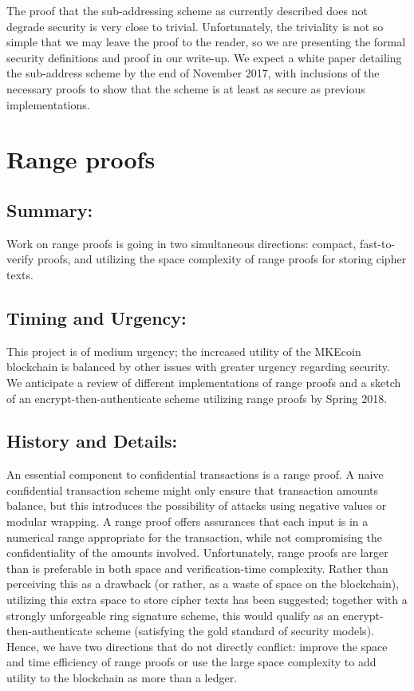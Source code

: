 \documentclass[12pt,english]{mrl}
\theoremstyle{definition}
\numberwithin{equation}{section}
\numberwithin{figure}{section}
\numberwithin{equation}{section}
\numberwithin{equation}{section}
\numberwithin{figure}{section}
\begin{document}
The proof that the sub-addressing scheme as currently described does not degrade security is very close to trivial. Unfortunately, the triviality is not so simple that we may leave the proof to the reader, so we are presenting the formal security definitions and proof in our write-up. We expect a white paper detailing the sub-address scheme by the end of November 2017, with inclusions of the necessary proofs to show that the scheme is at least as secure as previous implementations.





\section{Range proofs} 

\subsection{Summary:} 

Work on range proofs is going in two simultaneous directions: compact, fast-to-verify proofs, and utilizing the space complexity of range proofs for storing cipher texts.

\subsection{Timing and Urgency:} 

This project is of medium urgency; the increased utility of the MKEcoin blockchain is balanced by other issues with greater urgency regarding security. We anticipate a review of different implementations of range proofs and a sketch of an encrypt-then-authenticate scheme utilizing range proofs by Spring 2018.

\subsection{History and Details:} 

An essential component to confidential transactions is a range proof. A naive confidential transaction scheme might only ensure that transaction amounts balance, but this introduces the possibility of attacks using negative values or modular wrapping. A range proof offers assurances that each input is in a numerical range appropriate for the transaction, while not compromising the confidentiality of the amounts involved. Unfortunately, range proofs are larger than is preferable in both space and verification-time complexity. Rather than perceiving this as a drawback (or rather, as a waste of space on the blockchain), utilizing this extra space to store cipher texts has been suggested; together with a strongly unforgeable ring signature scheme, this would qualify as an encrypt-then-authenticate scheme (satisfying the gold standard of security models). Hence, we have two directions that do not directly conflict: improve the space and time efficiency of range proofs or use the large space complexity to add utility to the blockchain as more than a ledger.
\end{document}
